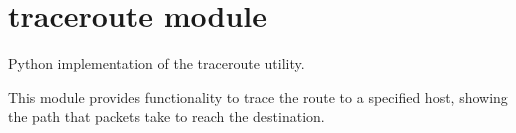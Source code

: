 \documentclass[letterpaper,10pt,english]{sphinxmanual}
\begin{document}
\sphinxstepscope


\chapter{traceroute module}
\label{\detokenize{traceroute:module-traceroute}}\label{\detokenize{traceroute:traceroute-module}}\label{\detokenize{traceroute::doc}}
\sphinxAtStartPar
Python implementation of the traceroute utility.

\sphinxAtStartPar
This module provides functionality to trace the route to a specified host,
showing the path that packets take to reach the destination.
\end{document}
